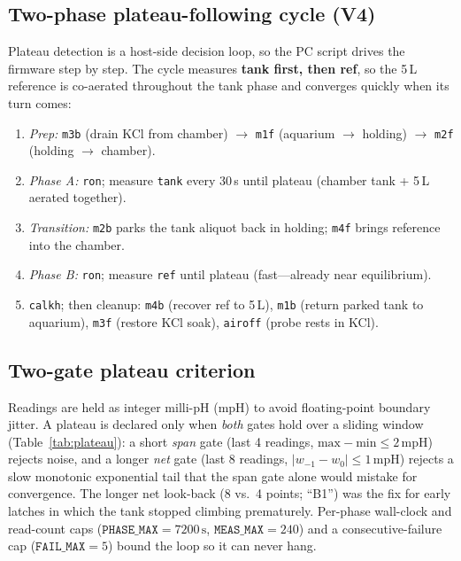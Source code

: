 \documentclass[11pt]{article}
\begin{document}
\subsection{Two-phase plateau-following cycle (V4)}
Plateau detection is a host-side decision loop, so the PC script drives the
firmware step by step. The cycle measures \textbf{tank first, then ref}, so the
5\,L reference is co-aerated throughout the tank phase and converges quickly
when its turn comes:
\begin{enumerate}[nosep,leftmargin=1.6em]
\item \emph{Prep:} \texttt{m3b} (drain KCl from chamber)
$\rightarrow$ \texttt{m1f} (aquarium $\to$ holding)
$\rightarrow$ \texttt{m2f} (holding $\to$ chamber).
\item \emph{Phase A:} \texttt{ron}; measure \texttt{tank} every 30\,s until
plateau (chamber tank + 5\,L aerated together).
\item \emph{Transition:} \texttt{m2b} parks the tank aliquot back in holding;
\texttt{m4f} brings reference into the chamber.
\item \emph{Phase B:} \texttt{ron}; measure \texttt{ref} until plateau
(fast---already near equilibrium).
\item \texttt{calkh}; then cleanup: \texttt{m4b} (recover ref to 5\,L),
\texttt{m1b} (return parked tank to aquarium), \texttt{m3f} (restore KCl soak),
\texttt{airoff} (probe rests in KCl).
\end{enumerate}

\subsection{Two-gate plateau criterion}
Readings are held as integer milli-pH (mpH) to avoid floating-point boundary
jitter. A plateau is declared only when \emph{both} gates hold over a sliding
window (Table~\ref{tab:plateau}): a short \emph{span} gate (last 4 readings,
$\mathrm{max}-\mathrm{min}\le 2$\,mpH) rejects noise, and a longer \emph{net}
gate (last 8 readings, $|w_{-1}-w_{0}|\le 1$\,mpH) rejects a slow monotonic
exponential tail that the span gate alone would mistake for convergence. The
longer net look-back (8 vs.\ 4 points; ``B1'') was the fix for early latches in
which the tank stopped climbing prematurely. Per-phase wall-clock and
read-count caps ($\mathtt{PHASE\_MAX}=7200\,\mathrm{s}$,
$\mathtt{MEAS\_MAX}=240$) and a consecutive-failure cap
($\mathtt{FAIL\_MAX}=5$) bound the loop so it can never hang.
\end{document}
